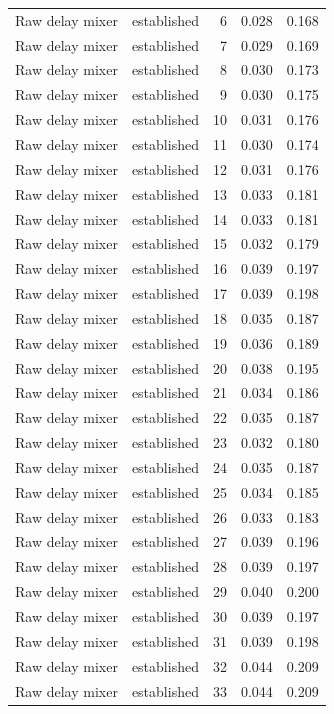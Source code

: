 \begin{tabular}{llrrr}
Raw delay mixer & established & 6 & 0.028 & 0.168 \\
Raw delay mixer & established & 7 & 0.029 & 0.169 \\
Raw delay mixer & established & 8 & 0.030 & 0.173 \\
Raw delay mixer & established & 9 & 0.030 & 0.175 \\
Raw delay mixer & established & 10 & 0.031 & 0.176 \\
Raw delay mixer & established & 11 & 0.030 & 0.174 \\
Raw delay mixer & established & 12 & 0.031 & 0.176 \\
Raw delay mixer & established & 13 & 0.033 & 0.181 \\
Raw delay mixer & established & 14 & 0.033 & 0.181 \\
Raw delay mixer & established & 15 & 0.032 & 0.179 \\
Raw delay mixer & established & 16 & 0.039 & 0.197 \\
Raw delay mixer & established & 17 & 0.039 & 0.198 \\
Raw delay mixer & established & 18 & 0.035 & 0.187 \\
Raw delay mixer & established & 19 & 0.036 & 0.189 \\
Raw delay mixer & established & 20 & 0.038 & 0.195 \\
Raw delay mixer & established & 21 & 0.034 & 0.186 \\
Raw delay mixer & established & 22 & 0.035 & 0.187 \\
Raw delay mixer & established & 23 & 0.032 & 0.180 \\
Raw delay mixer & established & 24 & 0.035 & 0.187 \\
Raw delay mixer & established & 25 & 0.034 & 0.185 \\
Raw delay mixer & established & 26 & 0.033 & 0.183 \\
Raw delay mixer & established & 27 & 0.039 & 0.196 \\
Raw delay mixer & established & 28 & 0.039 & 0.197 \\
Raw delay mixer & established & 29 & 0.040 & 0.200 \\
Raw delay mixer & established & 30 & 0.039 & 0.197 \\
Raw delay mixer & established & 31 & 0.039 & 0.198 \\
Raw delay mixer & established & 32 & 0.044 & 0.209 \\
Raw delay mixer & established & 33 & 0.044 & 0.209 \\

\end{tabular}
